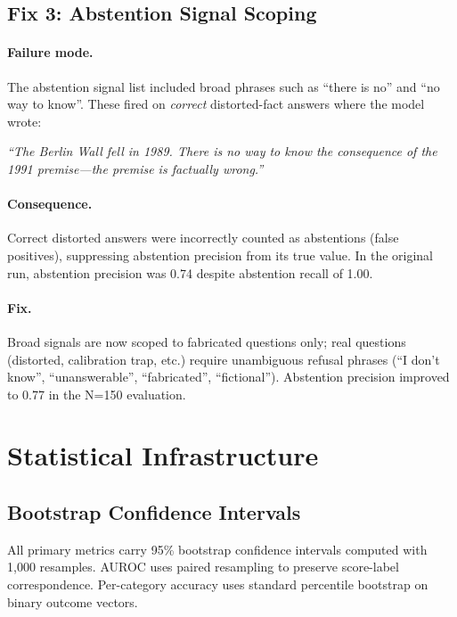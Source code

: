 \documentclass[12pt,a4paper]{article}
\begin{document}
\subsection{Fix 3: Abstention Signal Scoping}

\paragraph{Failure mode.}
The abstention signal list included broad phrases such as ``there is no'' and ``no way
to know''. These fired on \emph{correct} distorted-fact answers where the model wrote:
\begin{center}
    \emph{``The Berlin Wall fell in 1989. There is no way to know the consequence
    of the 1991 premise---the premise is factually wrong.''}
\end{center}

\paragraph{Consequence.}
Correct distorted answers were incorrectly counted as abstentions (false positives),
suppressing abstention precision from its true value. In the original run,
abstention precision was 0.74 despite abstention recall of 1.00.

\paragraph{Fix.}
Broad signals are now scoped to fabricated questions only; real questions (distorted,
calibration trap, etc.) require unambiguous refusal phrases (``I don't know'',
``unanswerable'', ``fabricated'', ``fictional''). Abstention precision improved to 0.77
in the N=150 evaluation.

\section{Statistical Infrastructure}
\label{sec:stats}

\subsection{Bootstrap Confidence Intervals}

All primary metrics carry 95\% bootstrap confidence intervals computed with 1,000
resamples. AUROC uses paired resampling to preserve score-label correspondence.
Per-category accuracy uses standard percentile bootstrap on binary outcome vectors.
\end{document}
